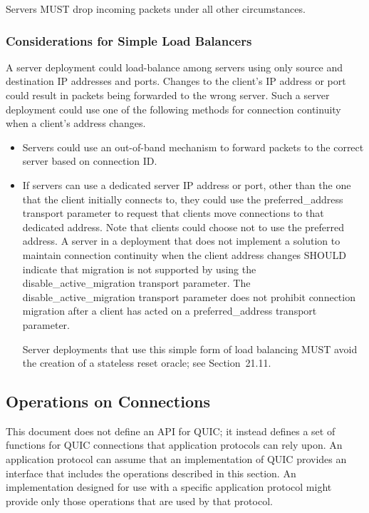\documentclass{article}
\begin{document}
Servers MUST drop incoming packets under all other circumstances.

\subsubsection{Considerations for Simple Load Balancers}

A server deployment could load-balance among servers using only source and destination IP addresses and ports.  Changes to the client's IP address or port could result in packets being forwarded to the wrong server.  Such a server deployment could use one of the following methods for connection continuity when a client's address changes.

\begin{itemize}
\item Servers could use an out-of-band mechanism to forward packets to the correct server based on connection ID.
\item If servers can use a dedicated server IP address or port, other than the one that the client initially connects to, they could use the preferred\_address transport parameter to request that clients move connections to that dedicated address.  Note that clients could choose not to use the preferred address.
A server in a deployment that does not implement a solution to maintain connection continuity when the client address changes SHOULD indicate that migration is not supported by using the disable\_active\_migration transport parameter.  The disable\_active\_migration transport parameter does not prohibit connection migration after a client has acted on a preferred\_address transport parameter.

Server deployments that use this simple form of load balancing MUST avoid the creation of a stateless reset oracle; see Section~21.11.

\end{itemize}
\subsection{Operations on Connections}

This document does not define an API for QUIC; it instead defines a set of functions for QUIC connections that application protocols can rely upon.  An application protocol can assume that an implementation of QUIC provides an interface that includes the operations described in this section.  An implementation designed for use with a specific application protocol might provide only those operations that are used by that protocol.
\end{document}
